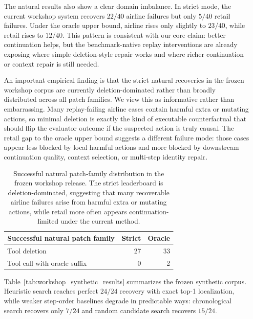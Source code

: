 \documentclass{article}
\begin{document}
The natural results also show a clear domain imbalance. In strict mode, the
current workshop system recovers $22/40$ airline failures but only $5/40$
retail failures. Under the oracle upper bound, airline rises only slightly to
$23/40$, while retail rises to $12/40$. This pattern is consistent with our
core claim: better continuation helps, but the benchmark-native replay
interventions are already exposing where simple deletion-style repair works and
where richer continuation or context repair is still needed.

An important empirical finding is that the strict natural recoveries in the
frozen workshop corpus are currently deletion-dominated rather than broadly
distributed across all patch families. We view this as informative rather than
embarrassing. Many replay-failing airline cases contain harmful extra or
mutating actions, so minimal deletion is exactly the kind of executable
counterfactual that should flip the evaluator outcome if the suspected action
is truly causal. The retail gap to the oracle upper bound suggests a different
failure mode: those cases appear less blocked by local harmful actions and more
blocked by downstream continuation quality, context selection, or multi-step
identity repair.

\begin{table}[t]
\centering
\small
\begin{tabular}{lrr}
\toprule
Successful natural patch family & Strict & Oracle \\
\midrule
Tool deletion & 27 & 33 \\
Tool call with oracle suffix & 0 & 2 \\
\bottomrule
\end{tabular}
\caption{Successful natural patch-family distribution in the frozen workshop
release. The strict leaderboard is deletion-dominated, suggesting that many
recoverable airline failures arise from harmful extra or mutating actions,
while retail more often appears continuation-limited under the current method.}
\label{tab:workshop_patch_families}
\end{table}

Table~\ref{tab:workshop_synthetic_results} summarizes the frozen synthetic
corpus. Heuristic search reaches perfect $24/24$ recovery with exact top-1
localization, while weaker step-order baselines degrade in predictable ways:
chronological search recovers only $7/24$ and random candidate search recovers
$15/24$.
\end{document}
